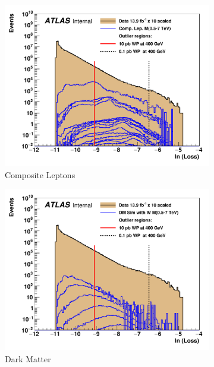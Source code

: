 \begin{figure}[H]
    \centering
    \begin{subfigure}[h]{0.45\linewidth}
    \includegraphics[scale=0.35]{figs/ch6/ar/plot_loss_cut_complep.pdf}%
    \caption{Composite Leptons}
    \end{subfigure}
    \hfill
    \begin{subfigure}[h]{0.45\linewidth}
    \includegraphics[scale=0.35]{figs/ch6/ar/plot_loss_cut_dmsim.pdf}%
    \caption{Dark Matter}
    \end{subfigure}
    \hfill
    \begin{subfigure}[h]{0.45\linewidth}

\end{subfigure}
\end{figure}
